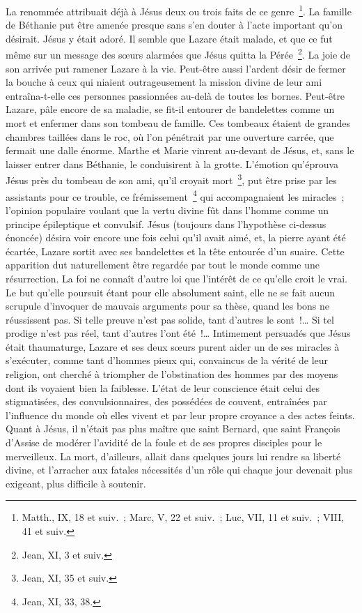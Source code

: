 \documentclass[french,twoside]{book} %
\begin{document}
La renommée attribuait déjà à Jésus deux ou trois faits de ce genre \footnote{Matth., IX, 18 et suiv. ; Marc, V, 22 et suiv. ; Luc, VII, 11 et suiv. ; VIII, 41 et suiv.}. La famille de Béthanie put être amenée presque sans s’en douter à l’acte important qu’on désirait. Jésus y était adoré. Il semble que Lazare était malade, et que ce fut même sur un message des sœurs alarmées que Jésus quitta la Pérée \footnote{Jean, XI, 3 et suiv.}. La joie de son arrivée put ramener Lazare à la vie. Peut-être aussi l’ardent désir de fermer la bouche à ceux qui niaient outrageusement la mission divine de leur ami entraîna-t-elle ces personnes passionnées au-delà de toutes les bornes. Peut-être Lazare, pâle encore de sa maladie, se fit-il entourer de bandelettes comme un mort et enfermer dans son tombeau de famille. Ces tombeaux étaient de grandes chambres taillées dans le roc, où l’on pénétrait par une ouverture carrée, que fermait une dalle énorme. Marthe et Marie vinrent au-devant de Jésus, et, sans le laisser entrer dans Béthanie, le conduisirent à la grotte. L’émotion qu’éprouva Jésus près du tombeau de son ami, qu’il croyait mort \footnote{Jean, XI, 35 et suiv.}, put être prise par les assistants pour ce trouble, ce frémissement \footnote{Jean, XI, 33, 38.} qui accompagnaient les miracles ; l’opinion populaire voulant que la vertu divine fût dans l’homme comme un principe épileptique et convulsif. Jésus (toujours dans l’hypothèse ci-dessus énoncée) désira voir encore une fois celui qu’il avait aimé, et, la pierre ayant été écartée, Lazare sortit avec ses bandelettes et la tête entourée d’un suaire. Cette apparition dut naturellement être regardée par tout le monde comme une résurrection. La foi ne connaît d’autre loi que l’intérêt de ce qu’elle croit le vrai. Le but qu’elle poursuit étant pour elle absolument saint, elle ne se fait aucun scrupule d’invoquer de mauvais arguments pour sa thèse, quand les bons ne réussissent pas. Si telle preuve n’est pas solide, tant d’autres le sont !… Si tel prodige n’est pas réel, tant d’autres l’ont été !… Intimement persuadés que Jésus était thaumaturge, Lazare et ses deux sœurs purent aider un de ses miracles à s’exécuter, comme tant d’hommes pieux qui, convaincus de la vérité de leur religion, ont cherché à triompher de l’obstination des hommes par des moyens dont ils voyaient bien la faiblesse. L’état de leur conscience était celui des stigmatisées, des convulsionnaires, des possédées de couvent, entraînées par l’influence du monde où elles vivent et par leur propre croyance a des actes feints. Quant à Jésus, il n’était pas plus maître que saint Bernard, que saint François d’Assise de modérer l’avidité de la foule et de ses propres disciples pour le merveilleux. La mort, d’ailleurs, allait dans quelques jours lui rendre sa liberté divine, et l’arracher aux fatales nécessités d’un rôle qui chaque jour devenait plus exigeant, plus difficile à soutenir.\par
\end{document}
